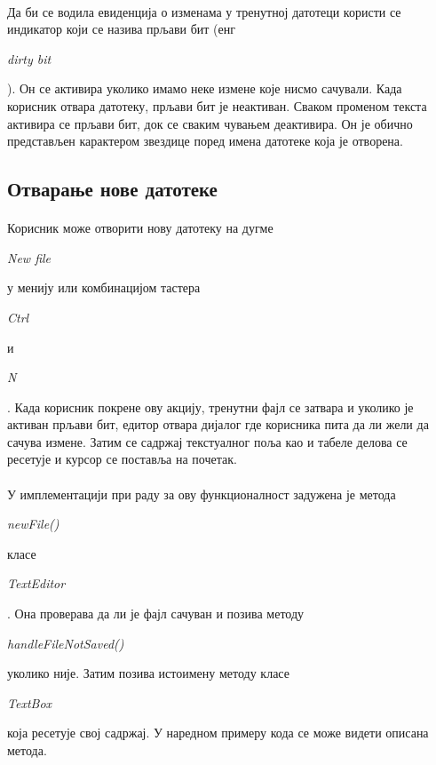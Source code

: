 \documentclass[12pt,oneside]{memoir}
\begin{document}
\paragraph{}
Да би се водила евиденција о изменама у тренутној датотеци користи
се индикатор који се назива прљави бит (енг \begin{latinica}\textit{dirty bit}\end{latinica}). Он се активира уколико имамо неке измене које нисмо сачували. Када корисник отвара датотеку, прљави бит је неактиван.
Сваком променом текста активира се прљави бит, док се сваким
чувањем деактивира. Он је обично представљен карактером звездице поред
имена датотеке која је отворена.

\subsection{Отварање нове датотеке}
\paragraph{}
Корисник може отворити нову датотеку на дугме 
\begin{latinica}\textit{New file}\end{latinica} у менију или комбинацијом тастера
\begin{latinica}\textit{Ctrl}\end{latinica} и
\begin{latinica}\textit{N}\end{latinica}. Када корисник покрене ову акцију,
тренутни фајл се затвара и уколико је активан прљави бит, едитор отвара
дијалог где корисника пита да ли жели да сачува измене. Затим се садржај
текстуалног поља као и табеле делова се ресетује и курсор се поставља на почетак.

\paragraph{}
У имплементацији при раду за ову функционалност задужена је метода
\begin{latinica}\textit{newFile()}\end{latinica} класе
\begin{latinica}\textit{TextEditor}\end{latinica}. Она проверава да ли је фајл
сачуван и позива методу
\begin{latinica}\textit{handleFileNotSaved()}\end{latinica} 
уколико није. Затим позива истоимену методу класе \begin{latinica}\textit{TextBox}\end{latinica} која ресетује свој садржај.
У наредном примеру кода се може видети описана метода.
\end{document}
